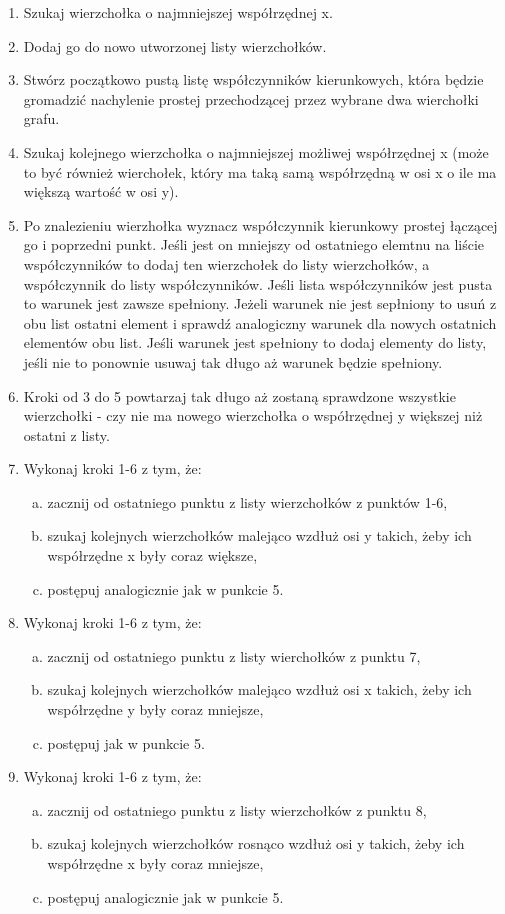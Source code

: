 \documentclass[10pt,a4paper]{article}
\begin{document}
\begin{enumerate}
    \item Szukaj wierzchołka o najmniejszej współrzędnej x.
    \item Dodaj go do nowo utworzonej listy wierzchołków.
    \item Stwórz początkowo pustą listę współczynników kierunkowych, która będzie gromadzić nachylenie prostej przechodzącej przez wybrane dwa wierchołki grafu.
    \item Szukaj kolejnego wierzchołka o najmniejszej możliwej współrzędnej x (może to być również wierchołek, który ma taką samą współrzędną w osi x o ile ma większą wartość w osi y).
    \item Po znalezieniu wierzhołka wyznacz współczynnik kierunkowy prostej łączącej go i poprzedni punkt. Jeśli jest on mniejszy od ostatniego elemtnu na liście współczynników to dodaj ten wierzchołek do listy wierzchołków, a współczynnik do listy współczynników. Jeśli lista współczynników jest pusta to warunek jest zawsze spełniony. Jeżeli warunek nie jest sepłniony to usuń z obu list ostatni element i sprawdź analogiczny warunek dla nowych ostatnich elementów obu list. Jeśli warunek jest spełniony to dodaj elementy do listy, jeśli nie to ponownie usuwaj tak długo aż warunek będzie spełniony.
    \item Kroki od 3 do 5 powtarzaj tak długo aż zostaną sprawdzone wszystkie wierzchołki - czy nie ma nowego wierzchołka o współrzędnej y większej niż ostatni z listy.
    \item Wykonaj kroki 1-6 z tym, że:
    \begin{enumerate}[a)]
        \item zacznij od ostatniego punktu z listy wierzchołków z punktów 1-6,
        \item szukaj kolejnych wierzchołków malejąco wzdłuż osi y takich, żeby ich współrzędne x były coraz większe,
        \item postępuj analogicznie jak w punkcie 5.
    \end{enumerate}
    \item Wykonaj kroki 1-6 z tym, że:
    \begin{enumerate}[a)]
        \item zacznij od ostatniego punktu z listy wierchołków z punktu 7,
        \item szukaj kolejnych wierzchołków malejąco wzdłuż osi x takich, żeby ich współrzędne y były coraz mniejsze,
        \item postępuj jak w punkcie 5.
    \end{enumerate}
    \item Wykonaj kroki 1-6 z tym, że:
    \begin{enumerate}[a)]
        \item zacznij od ostatniego punktu z listy wierzchołków z punktu 8,
        \item szukaj kolejnych wierzchołków rosnąco wzdłuż osi y takich, żeby ich współrzędne x były coraz mniejsze,
        \item postępuj analogicznie jak w punkcie 5.
    \end{enumerate}
\end{enumerate}
\end{document}
